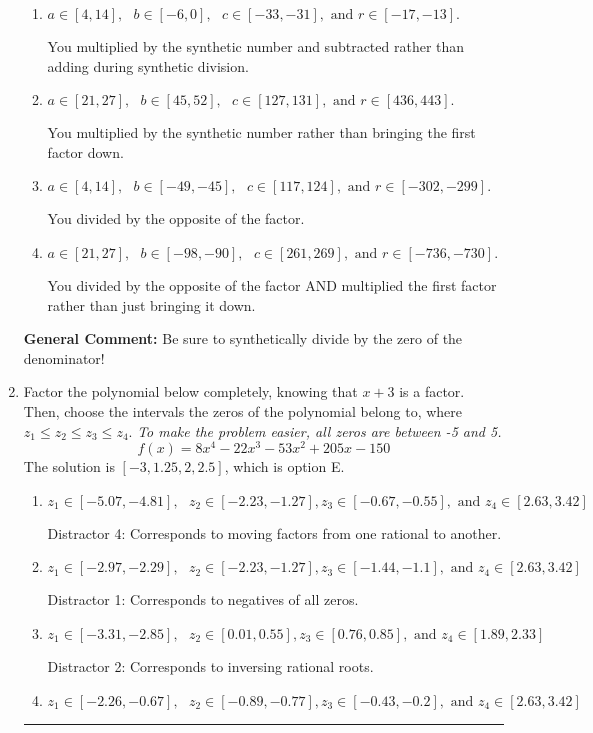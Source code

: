 \documentclass{extbook}[14pt]
\newcommand{\litem}[1]{\item #1

\rule{\textwidth}{0.4pt}}
\begin{document}
\begin{enumerate}
{\begin{enumerate}[label=\Alph*.]
* This is the solution!
\item \( a \in [4, 14], \text{   } b \in [-6, 0], \text{   } c \in [-33, -31], \text{   and   } r \in [-17, -13]. \)

 You multiplied by the synthetic number and subtracted rather than adding during synthetic division.
\item \( a \in [21, 27], \text{   } b \in [45, 52], \text{   } c \in [127, 131], \text{   and   } r \in [436, 443]. \)

 You multiplied by the synthetic number rather than bringing the first factor down.
\item \( a \in [4, 14], \text{   } b \in [-49, -45], \text{   } c \in [117, 124], \text{   and   } r \in [-302, -299]. \)

 You divided by the opposite of the factor.
\item \( a \in [21, 27], \text{   } b \in [-98, -90], \text{   } c \in [261, 269], \text{   and   } r \in [-736, -730]. \)

 You divided by the opposite of the factor AND multiplied the first factor rather than just bringing it down.
\end{enumerate}

\textbf{General Comment:} Be sure to synthetically divide by the zero of the denominator!
}
\litem{
Factor the polynomial below completely, knowing that $x+3$ is a factor. Then, choose the intervals the zeros of the polynomial belong to, where $z_1 \leq z_2 \leq z_3 \leq z_4$. \textit{To make the problem easier, all zeros are between -5 and 5.}
\[ f(x) = 8x^{4} -22 x^{3} -53 x^{2} +205 x -150 \]The solution is \( [-3, 1.25, 2, 2.5] \), which is option E.\begin{enumerate}[label=\Alph*.]
\item \( z_1 \in [-5.07, -4.81], \text{   }  z_2 \in [-2.23, -1.27], z_3 \in [-0.67, -0.55], \text{   and   } z_4 \in [2.63, 3.42] \)

 Distractor 4: Corresponds to moving factors from one rational to another.
\item \( z_1 \in [-2.97, -2.29], \text{   }  z_2 \in [-2.23, -1.27], z_3 \in [-1.44, -1.1], \text{   and   } z_4 \in [2.63, 3.42] \)

 Distractor 1: Corresponds to negatives of all zeros.
\item \( z_1 \in [-3.31, -2.85], \text{   }  z_2 \in [0.01, 0.55], z_3 \in [0.76, 0.85], \text{   and   } z_4 \in [1.89, 2.33] \)

 Distractor 2: Corresponds to inversing rational roots.
\item \( z_1 \in [-2.26, -0.67], \text{   }  z_2 \in [-0.89, -0.77], z_3 \in [-0.43, -0.2], \text{   and   } z_4 \in [2.63, 3.42] \)


\end{enumerate}}
\end{enumerate}
\end{document}
